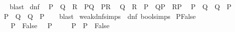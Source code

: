 \begin{isabellebody}
%
\isadelimproof
\ \ %
\endisadelimproof
%
\isatagproof
{}\isamarkupfalse%
\ blast{\isacharplus}{\kern0pt}%
\endisatagproof
{\isafoldproof}%
%
\isadelimproof
\isanewline
%
\endisadelimproof
\isanewline
{}\isamarkupfalse%
\ dnf{\isacharcolon}{\kern0pt}\isanewline
\ \ {\isachardoublequoteopen}{\isacharparenleft}{\kern0pt}P\ {\isasymand}\ {\isacharparenleft}{\kern0pt}Q\ {\isasymor}\ R{\isacharparenright}{\kern0pt}{\isacharparenright}{\kern0pt}\ {\isacharequal}{\kern0pt}\ {\isacharparenleft}{\kern0pt}{\isacharparenleft}{\kern0pt}P{\isasymand}Q{\isacharparenright}{\kern0pt}\ {\isasymor}\ {\isacharparenleft}{\kern0pt}P{\isasymand}R{\isacharparenright}{\kern0pt}{\isacharparenright}{\kern0pt}{\isachardoublequoteclose}\isanewline
\ \ {\isachardoublequoteopen}{\isacharparenleft}{\kern0pt}{\isacharparenleft}{\kern0pt}Q\ {\isasymor}\ R{\isacharparenright}{\kern0pt}\ {\isasymand}\ P{\isacharparenright}{\kern0pt}\ {\isacharequal}{\kern0pt}\ {\isacharparenleft}{\kern0pt}{\isacharparenleft}{\kern0pt}Q{\isasymand}P{\isacharparenright}{\kern0pt}\ {\isasymor}\ {\isacharparenleft}{\kern0pt}R{\isasymand}P{\isacharparenright}{\kern0pt}{\isacharparenright}{\kern0pt}{\isachardoublequoteclose}\isanewline
\ \ {\isachardoublequoteopen}{\isacharparenleft}{\kern0pt}P\ {\isasymand}\ Q{\isacharparenright}{\kern0pt}\ {\isacharequal}{\kern0pt}\ {\isacharparenleft}{\kern0pt}Q\ {\isasymand}\ P{\isacharparenright}{\kern0pt}{\isachardoublequoteclose}\isanewline
\ \ {\isachardoublequoteopen}{\isacharparenleft}{\kern0pt}P\ {\isasymor}\ Q{\isacharparenright}{\kern0pt}\ {\isacharequal}{\kern0pt}\ {\isacharparenleft}{\kern0pt}Q\ {\isasymor}\ P{\isacharparenright}{\kern0pt}{\isachardoublequoteclose}\isanewline
%
\isadelimproof
\ \ %
\endisadelimproof
%
\isatagproof
{}\isamarkupfalse%
\ blast{\isacharplus}{\kern0pt}%
\endisatagproof
{\isafoldproof}%
%
\isadelimproof
\isanewline
%
\endisadelimproof
\isanewline
{}\isamarkupfalse%
\ weak{\isacharunderscore}{\kern0pt}dnf{\isacharunderscore}{\kern0pt}simps\ {\isacharequal}{\kern0pt}\ dnf\ bool{\isacharunderscore}{\kern0pt}simps\isanewline
\isanewline
{}\isamarkupfalse%
\ PFalse{\isacharcolon}{\kern0pt}\isanewline
\ \ \ \ {\isachardoublequoteopen}P\ {\isasymequiv}\ False\ {\isasymLongrightarrow}\ {\isasymnot}\ P{\isachardoublequoteclose}\isanewline
\ \ \ \ {\isachardoublequoteopen}{\isasymnot}\ P\ {\isasymLongrightarrow}\ {\isacharparenleft}{\kern0pt}P\ {\isasymequiv}\ False{\isacharparenright}{\kern0pt}{\isachardoublequoteclose}\isanewline
%
\isadelimproof
\ \ %
\endisadelimproof

\end{isabellebody}
